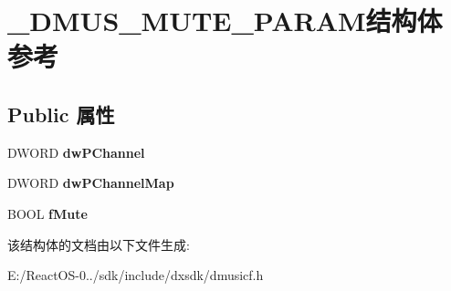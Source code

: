 \hypertarget{struct___d_m_u_s___m_u_t_e___p_a_r_a_m}{}\section{\+\_\+\+D\+M\+U\+S\+\_\+\+M\+U\+T\+E\+\_\+\+P\+A\+R\+A\+M结构体 参考}
\label{struct___d_m_u_s___m_u_t_e___p_a_r_a_m}
\subsection*{Public 属性}
\begin{DoxyCompactItemize}
\item 
\mbox{\label{struct___d_m_u_s___m_u_t_e___p_a_r_a_m_a11b1821bb5e2af2456b37876d64e7dd1}} 
D\+W\+O\+RD {\bfseries dw\+P\+Channel}
\item 
\mbox{\label{struct___d_m_u_s___m_u_t_e___p_a_r_a_m_aacabf4e172b9ccd09830ed5b34359f0e}} 
D\+W\+O\+RD {\bfseries dw\+P\+Channel\+Map}
\item 
\mbox{\label{struct___d_m_u_s___m_u_t_e___p_a_r_a_m_af56e44f89f323411718e325b30edc65c}} 
B\+O\+OL {\bfseries f\+Mute}
\end{DoxyCompactItemize}


该结构体的文档由以下文件生成\+:\begin{DoxyCompactItemize}
\item 
E\+:/\+React\+O\+S-\/0../sdk/include/dxsdk/dmusicf.\+h\end{DoxyCompactItemize}
